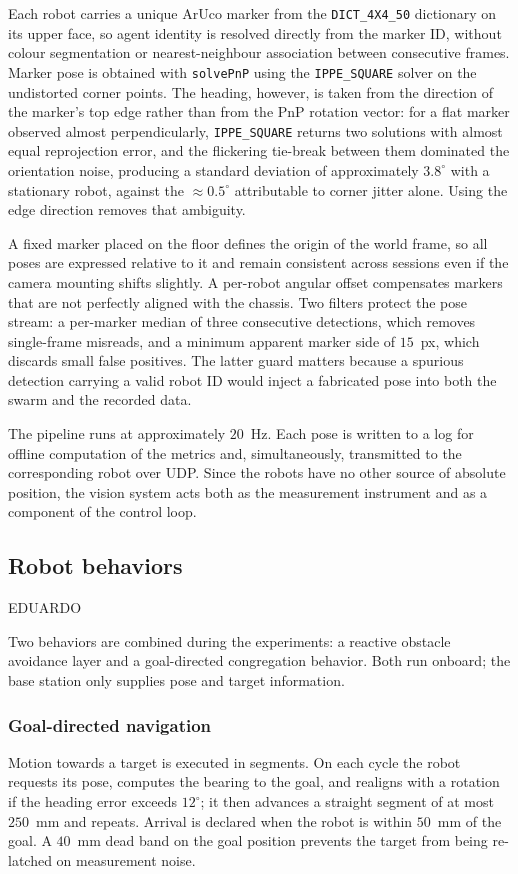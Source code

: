 \documentclass[conference]{IEEEtran}
\begin{document}
Each robot carries a unique ArUco marker from the \texttt{DICT\_4X4\_50}
dictionary on its upper face, so agent identity is resolved directly from the
marker ID, without colour segmentation or nearest-neighbour association between
consecutive frames. Marker pose is obtained with \texttt{solvePnP} using the
\texttt{IPPE\_SQUARE} solver on the undistorted corner points. The heading,
however, is taken from the direction of the marker's top edge rather than from
the PnP rotation vector: for a flat marker observed almost perpendicularly,
\texttt{IPPE\_SQUARE} returns two solutions with almost equal reprojection
error, and the flickering tie-break between them dominated the orientation
noise, producing a standard deviation of approximately $3.8^\circ$ with a
stationary robot, against the $\approx 0.5^\circ$ attributable to corner jitter
alone. Using the edge direction removes that ambiguity.

A fixed marker placed on the floor defines the origin of the world frame, so all
poses are expressed relative to it and remain consistent across sessions even if
the camera mounting shifts slightly. A per-robot angular offset compensates
markers that are not perfectly aligned with the chassis. Two filters protect the
pose stream: a per-marker median of three consecutive detections, which removes
single-frame misreads, and a minimum apparent marker side of $15$~px, which
discards small false positives. The latter guard matters because a spurious
detection carrying a valid robot ID would inject a fabricated pose into both the
swarm and the recorded data.

The pipeline runs at approximately $20$~Hz. Each pose is written to a log for
offline computation of the metrics and, simultaneously, transmitted to the
corresponding robot over UDP. Since the robots have no other source of absolute
position, the vision system acts both as the measurement instrument and as a
component of the control loop.

\subsection{Robot behaviors}
EDUARDO

Two behaviors are combined during the experiments: a reactive obstacle avoidance
layer and a goal-directed congregation behavior. Both run onboard; the base
station only supplies pose and target information.

\subsubsection{Goal-directed navigation}
Motion towards a target is executed in segments. On each cycle the robot
requests its pose, computes the bearing to the goal, and realigns with a
rotation if the heading error exceeds $12^\circ$; it then advances a straight
segment of at most $250$~mm and repeats. Arrival is declared when the robot is
within $50$~mm of the goal. A $40$~mm dead band on the goal position prevents
the target from being re-latched on measurement noise.
\end{document}
